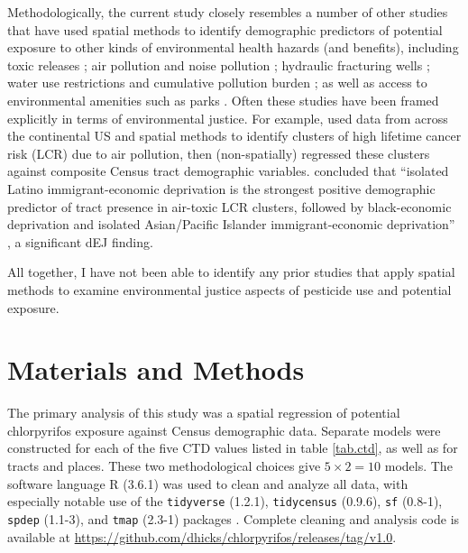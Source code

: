 \documentclass[ijerph,article,submit,oneauthor,pdftex]{Definitions/mdpi}
\begin{document}
Methodologically, the current study closely resembles a number of other studies that have used spatial methods to identify demographic predictors of potential exposure to other kinds of environmental health hazards (and benefits), including toxic releases \citep{LievanosSociospatialDimensionsWater2017, BakhtsiyaravaEnvironmentalInequalityPollution2017}; 
air pollution \citep{GrineskiAsianAmericansDisproportionate2017, Lome-HurtadoEnvironmentalInjusticeMexico2019, MaSpatialAnalysisAir2019} and noise pollution \citep{VerbeekUnequalResidentialExposure2019};
hydraulic fracturing wells \citep{SilvaSpatialModelingIdentify2018};
water use restrictions \citep{WikstromEnvironmentalInequitiesWater2019}
and cumulative pollution burden \citep{LievanosRetoolingCalEnviroScreenCumulative2018}; as well as access to environmental amenities such as parks \citep{BaroOneCanopyAssessing2019, ChenEnvironmentalJusticePark2019}. Often these studies have been framed explicitly in terms of environmental justice. For example, \citet{LievanosRaceDeprivationImmigrant2015} used data from across the continental US and spatial methods to identify clusters of high lifetime cancer risk (LCR) due to air pollution, then (non-spatially) regressed these clusters against composite Census tract demographic variables. \citet{LievanosRaceDeprivationImmigrant2015} concluded that ``isolated Latino immigrant-economic deprivation is the strongest positive demographic predictor of tract presence in air-toxic LCR clusters, followed by black-economic deprivation and isolated Asian/Pacific Islander immigrant-economic deprivation'' \citep[p 50]{LievanosRaceDeprivationImmigrant2015}, a significant dEJ finding.

All together, I have not been able to identify any prior studies that apply spatial methods to examine environmental justice aspects of pesticide use and potential exposure. 
 
\section{Materials and Methods}

The primary analysis of this study was a spatial regression of potential chlorpyrifos exposure against Census demographic data. Separate models were constructed for each of the five CTD values listed in table \ref{tab.ctd}, as well as for tracts and places. These two methodological choices give \(5 \times 2 = 10\) models. The software language R (3.6.1) was used to clean and analyze all data, with especially notable use of the \texttt{tidyverse} (1.2.1), \texttt{tidycensus} (0.9.6), \texttt{sf} (0.8-1), \texttt{spdep} (1.1-3), and \texttt{tmap} (2.3-1) packages \citep{WickhamTidyverseEasilyInstall2017, WalkerTidycensusLoadUS2018, PebesmaSfSimpleFeatures2018, BivandSpdepSpatialDependence2018, TennekesTmapThematicMaps2018}. Complete cleaning and analysis code is available at \url{https://github.com/dhicks/chlorpyrifos/releases/tag/v1.0}.
\end{document}
